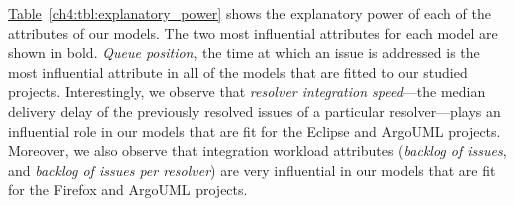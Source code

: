 \noindent{}
\hyperref[ch4:tbl:explanatory_power]{Table}~\ref{ch4:tbl:explanatory_power} shows the
explanatory power of each of the attributes of our models. The two most
influential attributes for each model are shown in bold. \textit{Queue
position}, \ie the time at which an issue is addressed is the most influential
attribute in all of the models that are fitted to our studied projects.
Interestingly, we observe that \textit{resolver integration speed}---the median
delivery delay of the previously resolved issues of a particular
resolver---plays an influential role in our models that are fit for the Eclipse
and ArgoUML projects. Moreover, we also observe that integration workload
attributes (\ie \textit{backlog of issues}, and \textit{backlog of issues per
resolver}) are very influential in our models that are fit for the Firefox and
ArgoUML projects.\\

